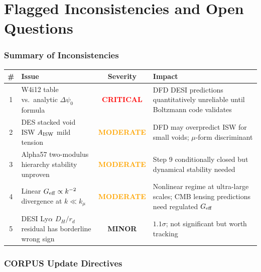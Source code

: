 \documentclass[11pt,a4paper]{article}
\newcommand{\mufd}{\mu}
\newcommand{\Geff}{G_{\rm eff}}
\newcommand{\kmu}{k_\mu}
\begin{document}
\part{Flagged Inconsistencies and Open Questions}
\label{part:flags}


\section{Summary of Inconsistencies}

\begin{center}
\begin{tabular}{clcp{6cm}}
\toprule
\textbf{\#} & \textbf{Issue} & \textbf{Severity} &
\textbf{Impact} \\
\midrule
1 & W4i12 table vs.\ analytic $\Delta\psi_0$ formula &
  \textcolor{red}{\textbf{CRITICAL}} &
  DFD DESI predictions quantitatively unreliable until Boltzmann
  code validates \\
2 & DES stacked void ISW $A_{\rm ISW}$ mild tension &
  \textcolor{orange}{\textbf{MODERATE}} &
  DFD may overpredict ISW for small voids; $\mufd$-form discriminant \\
3 & Alpha57 two-modulus hierarchy stability unproven &
  \textcolor{orange}{\textbf{MODERATE}} &
  Step 9 conditionally closed but dynamical stability needed \\
4 & Linear $\Geff \propto k^{-2}$ divergence at $k \ll \kmu$ &
  \textcolor{orange}{\textbf{MODERATE}} &
  Nonlinear regime at ultra-large scales; CMB lensing
  predictions need regulated $\Geff$ \\
5 & DESI Ly$\alpha$ $D_H/r_d$ residual has borderline wrong sign &
  \textcolor{yellow!70!black}{\textbf{MINOR}} &
  $1.1\sigma$; not significant but worth tracking \\
\bottomrule
\end{tabular}
\end{center}


\section{CORPUS Update Directives}
\label{sec:corpus-updates}
\end{document}
